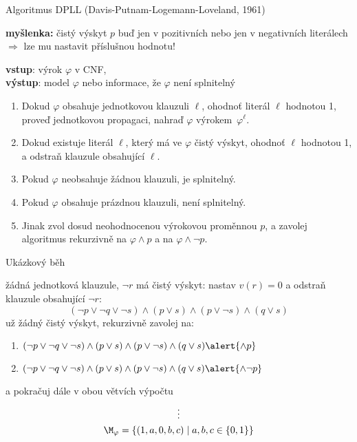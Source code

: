 \documentclass{beamer}
\begin{document}
\begin{frame}{Algoritmus DPLL (Davis-Putnam-Logemann-Loveland, 1961)}

    \textbf{myšlenka:} \alert{čistý výskyt} $p$  buď jen v pozitivních nebo jen v negativních literálech $\Rightarrow$ lze mu nastavit příslušnou hodnotu!

    \textbf{vstup}: výrok $\varphi$ v CNF,\\ 
    \textbf{výstup}: model $\varphi$ nebo informace, že  $\varphi$ není splnitelný
    \begin{enumerate}                
        \item Dokud $\varphi$ obsahuje jednotkovou klauzuli $\ell$, ohodnoť literál $\ell$ hodnotou 1, proveď \alert{jednotkovou propagaci}, nahraď $\varphi$ výrokem~$\varphi^\ell$.
         \item Dokud existuje literál $\ell$, který má ve $\varphi$ \alert{čistý výskyt}, ohodnoť $\ell$ hodnotou 1, a odstraň klauzule obsahující $\ell$.
        \item Pokud $\varphi$ neobsahuje žádnou klauzuli, je splnitelný.
        \item Pokud $\varphi$ obsahuje prázdnou klauzuli, není splnitelný.
        \item Jinak zvol dosud neohodnocenou výrokovou proměnnou $p$, a \alert{zavolej algoritmus rekurzivně} na $\varphi\land p$ a na $\varphi\land \neg p$.
    \end{enumerate}

\end{frame}


\begin{frame}{Ukázkový běh}

    
    žádná jednotková klauzule, $\neg r$ má \alert{čistý výskyt}: nastav  $v(r)=0$ a odstraň klauzule obsahující $\neg r$:
    $$
    (\neg p\lor\neg q\lor\neg s)\land (p\lor s)\land(p\lor\neg s)\land(q\lor s)
    $$
    už žádný čistý výskyt, rekurzivně zavolej na:
    \begin{enumerate}
        \item $(\neg p\lor\neg q\lor\neg s)\land (p\lor s)\land(p\lor\neg s)\land(q\lor s)\alert{\land p}$
        \item $(\neg p\lor\neg q\lor\neg s)\land (p\lor s)\land(p\lor\neg s)\land(q\lor s)\alert{\land \neg p}$
    \end{enumerate}
    a pokračuj dále v obou větvích výpočtu
    \begin{gather*}
        \vdots \\
        \M_\varphi=\{(1,a,0,b,c)\mid a,b,c\in\{0,1\}\}
    \end{gather*}
    
\end{frame}
\end{document}
